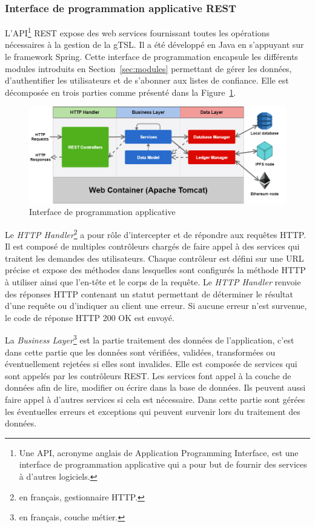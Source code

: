 \documentclass{tnreport}
\begin{document}
\subsubsection{Interface de programmation applicative REST}

L'API\footnote{Une API, acronyme anglais de Application Programming Interface, est une interface de programmation applicative qui a pour but de fournir des services à d'autres logiciels.} REST expose des web services fournissant toutes les opérations nécessaires à la gestion de la gTSL. Il a été développé en Java en s'appuyant sur le framework Spring. Cette interface de programmation encapsule les différents modules introduits en Section~\ref{sec:modules} permettant de gérer les données, d'authentifier les utilisateurs et de s'abonner aux listes de confiance. Elle est décomposée en trois parties comme présenté dans la Figure~\ref{fig:rest-api}.

\begin{figure}[h]
	\centering
	\includegraphics[scale=0.52]{figures/rest-api}
	\caption{Interface de programmation applicative}
	\label{fig:rest-api}
\end{figure}

Le \textit{HTTP Handler}\footnote{en français, gestionnaire HTTP.} a pour rôle d'intercepter et de répondre aux requêtes HTTP. Il est composé de multiples contrôleurs chargés de faire appel à des services qui traitent les demandes des utilisateurs. Chaque contrôleur est défini sur une URL précise et expose des méthodes dans lesquelles sont configurés la méthode HTTP à utiliser ainsi que l'en-tête et le corps de la requête. Le \textit{HTTP Handler} renvoie des réponses HTTP contenant un statut permettant de déterminer le résultat d'une requête ou d'indiquer au client une erreur. Si aucune erreur n'est survenue, le code de réponse HTTP 200 OK est envoyé.

La \textit{Business Layer}\footnote{en français, couche métier.} est la partie traitement des données de l'application, c'est dans cette partie que les données sont vérifiées, validées, transformées ou éventuellement rejetées si elles sont invalides. Elle est composée de services qui sont appelés par les contrôleurs REST. Les services font appel à la couche de données afin de lire, modifier ou
écrire dans la base de données. Ils peuvent aussi faire appel à d'autres services si cela est nécessaire. Dans cette partie sont gérées les éventuelles erreurs et exceptions qui peuvent survenir lors du traitement des données.
\end{document}
